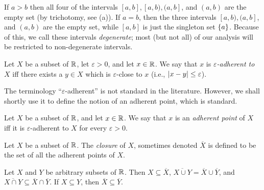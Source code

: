 \begin{eg}\label{i:9.1.4}
  If \(a > b\) then all four of the intervals \([a, b], [a, b), (a, b]\), and \((a, b)\) are the empty set (by trichotomy, see (a)).
  If \(a = b\), then the three intervals \([a, b), (a, b]\), and \((a, b)\) are the empty set, while \([a, b]\) is just the singleton set \(\left\lbrace a\right\rbrace\).
  Because of this, we call these intervals \emph{degenerate};
  most (but not all) of our analysis will be restricted to non-degenerate intervals.
\end{eg}

\begin{defn}\label{i:9.1.5}
  Let \(X\) be a subset of \(\mathbb{R}\), let \(\varepsilon > 0\), and let \(x \in \mathbb{R}\).
  We say that \(x\) is \emph{\(\varepsilon\)-adherent to \(X\)} iff there exists a \(y \in X\) which is \(\varepsilon\)-close to \(x\)
  (i.e., \(\left\lvert x - y\right\rvert \leq \varepsilon\)).
\end{defn}

\begin{rmk}\label{i:9.1.6}
  The terminology ``\(\varepsilon\)-adherent'' is not standard in the literature.
  However, we shall shortly use it to define the notion of an adherent point, which is standard.
\end{rmk}

\setcounter{thm}{7}
\begin{defn}\label{i:9.1.8}
  Let \(X\) be a subset of \(\mathbb{R}\), and let \(x \in \mathbb{R}\).
  We say that \(x\) is an \emph{adherent point} of \(X\) iff it is \(\varepsilon\)-adherent to \(X\) for every \(\varepsilon > 0\).
\end{defn}

\setcounter{thm}{9}
\begin{defn}[Closure]\label{i:9.1.10}
  Let \(X\) be a subset of \(\mathbb{R}\).
  The \emph{closure} of \(X\), sometimes denoted \(\overline{X}\) is defined to be the set of all the adherent points of \(X\).
\end{defn}

\begin{lem}\label{i:9.1.11}
  Let \(X\) and \(Y\) be arbitrary subsets of \(\mathbb{R}\).
  Then \(X \subseteq \overline{X}\), \(\overline{X \cup Y} = \overline{X} \cup \overline{Y}\), and \(\overline{X \cap Y} \subseteq \overline{X} \cap \overline{Y}\).
  If \(X \subseteq Y\), then \(\overline{X} \subseteq \overline{Y}\).
\end{lem}

